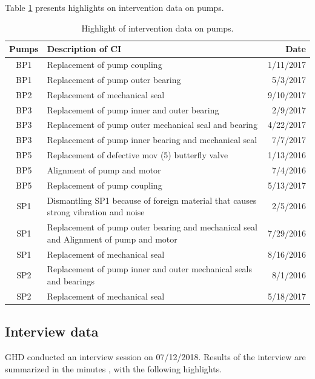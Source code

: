 
Table \ref{interventiondata} presents highlights on intervention data on pumps.

\begin{table}[h]
	\caption{Highlight of intervention data on pumps.}
	\label{interventiondata}
	{\footnotesize
		\begin{tabular}{c|p{8cm}|r}
			\hline
			Pumps & Description of CI & Date \\ 
			\hline
			BP1 & Replacement of pump coupling & 1/11/2017 \\ 
			BP1 & Replacement of pump outer bearing & 5/3/2017 \\ 
			BP2 & Replacement of mechanical seal & 9/10/2017 \\ 
			BP3 & Replacement of pump inner and outer bearing & 2/9/2017 \\ 
			BP3 & Replacement of pump outer mechanical seal and bearing & 4/22/2017 \\ 
			BP3 & Replacement of pump inner bearing and mechanical seal & 7/7/2017 \\ 
			BP5 & Replacement of defective mov (5) butterfly valve & 1/13/2016 \\ 
			BP5 & Alignment of pump and motor & 7/4/2016 \\ 
			BP5 & Replacement of pump coupling & 5/13/2017 \\ 
			SP1 & Dismantling SP1 because of foreign material that causes strong vibration and noise & 2/5/2016 \\ 
			SP1 & Replacement of pump outer bearing and mechanical seal and Alignment of pump and motor & 7/29/2016 \\ 
			SP1 & Replacement of mechanical seal & 8/16/2016 \\ 
			SP2 & Replacement of pump inner and outer mechanical seals and bearings & 8/1/2016 \\ 
			SP2 & Replacement of mechanical seal & 5/18/2017 \\ 
			\hline
		\end{tabular}
		
	}
\end{table}


\subsection{Interview data}
\label{213}
GHD conducted an interview session on 07/12/2018. Results of the interview are summarized in the minutes \cite{GHD2018l}, with the following highlights.


